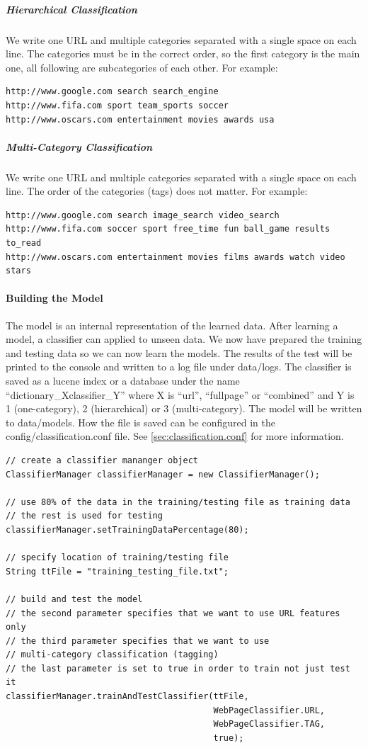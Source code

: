 \documentclass[a4paper,twoside]{book}      %
\begin{document}
\subparagraph{Hierarchical Classification}
We write one URL and multiple categories separated with a single space on each line. The categories must be in the correct order, so the first category is the main one, all following are subcategories of each other. For example:
\begin{verbatim}
http://www.google.com search search_engine
http://www.fifa.com sport team_sports soccer 
http://www.oscars.com entertainment movies awards usa
\end{verbatim}

\subparagraph{Multi-Category Classification}
We write one URL and multiple categories separated with a single space on each line. The order of the categories (tags) does not matter. For example:
\begin{verbatim}
http://www.google.com search image_search video_search
http://www.fifa.com soccer sport free_time fun ball_game results to_read
http://www.oscars.com entertainment movies films awards watch video stars
\end{verbatim}

\paragraph{Building the Model}
The model is an internal representation of the learned data. After learning a model, a classifier can applied to unseen data. We now have prepared the training and testing data so we can now learn the models. The results of the test will be printed to the console and written to a log file under data/logs. The classifier is saved as a lucene index or a database under the name ``dictionary\_Xclassifier\_Y'' where X is ``url'', ``fullpage'' or ``combined'' and Y is 1 (one-category), 2 (hierarchical) or 3 (multi-category). The model will be written to data/models. How the file is saved can be configured in the config/classification.conf file. See \ref{sec:classification.conf} for more information.

\begin{codelisting}
\begin{lstlisting}[frame=tb]
// create a classifier mananger object
ClassifierManager classifierManager = new ClassifierManager();

// use 80% of the data in the training/testing file as training data
// the rest is used for testing
classifierManager.setTrainingDataPercentage(80);

// specify location of training/testing file
String ttFile = "training_testing_file.txt";

// build and test the model
// the second parameter specifies that we want to use URL features only
// the third parameter specifies that we want to use 
// multi-category classification (tagging)
// the last parameter is set to true in order to train not just test it
classifierManager.trainAndTestClassifier(ttFile,
                                         WebPageClassifier.URL, 
                                         WebPageClassifier.TAG,
                                         true);
\end{lstlisting}
\end{codelisting}
\end{document}

